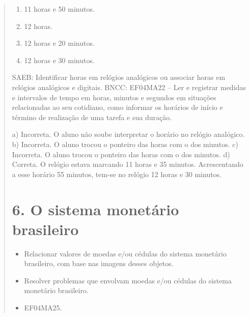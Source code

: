 \begin{enumerate}
\begin{escolha}
\begin{enumerate}
\begin{itemize}
\begin{itemize}
\begin{escolha}
\begin{quote}
\begin{enumerate}
\def\labelenumi{\alph{enumi})}
\item
  11 horas e 50 minutos.
\item
  12 horas.
\item
  12 horas e 20 minutos.
\item
  12 horas e 30 minutos.
\end{enumerate}

SAEB: Identificar horas em relógios analógicos ou associar horas em relógios analógicos e digitais.
BNCC: EF04MA22 -- Ler e registrar medidas e intervalos de tempo em horas, minutos e segundos em
situações relacionadas ao seu cotidiano, como informar os horários de início e término de realização
de uma tarefa e sua duração.

a) Incorreta. O aluno não soube interpretar o horário no relógio analógico.
b) Incorreta. O aluno trocou o ponteiro das horas com o dos minutos.
c) Incorreta. O aluno trocou o ponteiro das horas com o dos minutos.
d) Correta. O relógio estava marcando 11 horas e 35 minutos. Acrescentando a esse horário 55 minutos, tem-se no relógio 12 horas e 30 minutos.


\section{6. O sistema monetário brasileiro}\label{muxf3dulo-6}


\begin{itemize}
\item Relacionar valores de moedas e/ou cédulas do sistema monetário
brasileiro, com base nas imagens desses objetos.
\item Resolver problemas que envolvam moedas e/ou cédulas do sistema
monetário brasileiro.
\end{itemize}


\begin{itemize}
  \item EF04MA25.
\end{itemize}



\end{quote}
\end{escolha}
\end{itemize}
\end{itemize}
\end{enumerate}
\end{escolha}
\end{enumerate}
